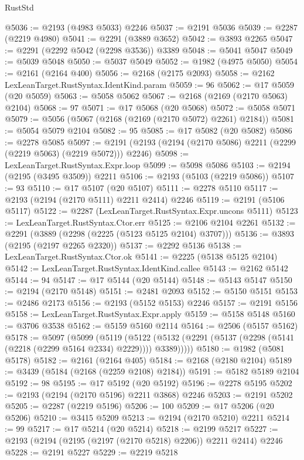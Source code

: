\begin{lexlean}{RustStd}
\begin{coremodule}
@5036 := @2193 (@4983 @5033) @2246
@5037 := @2191 @5036
@5039 := @2287 (@2219 @4980)
@5041 := @2291 (@3889 @3652)
@5042 := @3893 @2265
@5047 := @2291 (@2292 @5042 (@2298 @3536)) @3389
@5048 := @5041 @5047
@5049 := @5039 @5048
@5050 := @5037 @5049
@5052 := @1982 (@4975 @5050)
@5054 := @2161 (@2164 @400)
@5056 := @2168 (@2175 @2093)
@5058 := @2162 LexLeanTarget.RustSyntax.IdentKind.param
@5059 := 96
@5062 := @17 @5059 (@20 @5059)
@5063 := @5058 @5062
@5067 := @2168 (@2169 (@2170 @5063) @2104)
@5068 := 97
@5071 := @17 @5068 (@20 @5068)
@5072 := @5058 @5071
@5079 := @5056 (@5067 (@2168 (@2169 (@2170 @5072) @2261) @2184))
@5081 := @5054 @5079 @2104
@5082 := 95
@5085 := @17 @5082 (@20 @5082)
@5086 := @2278 @5085
@5097 := @2191 (@2193 (@2194 (@2170 @5086) @2211 (@2299 (@2219 @5063) (@2219 @5072))) @2246)
@5098 := LexLeanTarget.RustSyntax.Expr.loop
@5099 := @5098 @5086
@5103 := @2194 (@2195 (@3495 @3509)) @2211
@5106 := @2193 (@5103 (@2219 @5086))
@5107 := 93
@5110 := @17 @5107 (@20 @5107)
@5111 := @2278 @5110
@5117 := @2193 (@2194 (@2170 @5111) @2211 @2414) @2246
@5119 := @2191 (@5106 @5117)
@5122 := @2287 (LexLeanTarget.RustSyntax.Expr.uncons @5111)
@5123 := LexLeanTarget.RustSyntax.Ctor.err
@5125 := @2106 @2104 @2261
@5132 := @2291 (@3889 (@2298 (@2225 (@5123 @5125 @2104) @3707)))
@5136 := @3893 (@2195 (@2197 @2265 @2320))
@5137 := @2292 @5136
@5138 := LexLeanTarget.RustSyntax.Ctor.ok
@5141 := @2225 (@5138 @5125 @2104)
@5142 := LexLeanTarget.RustSyntax.IdentKind.callee
@5143 := @2162 @5142
@5144 := 94
@5147 := @17 @5144 (@20 @5144)
@5148 := @5143 @5147
@5150 := @2194 (@2170 @5148)
@5151 := @2481 @2093
@5152 := @5150 @5151
@5153 := @2486 @2173
@5156 := @2193 (@5152 @5153) @2246
@5157 := @2191 @5156
@5158 := LexLeanTarget.RustSyntax.Expr.apply
@5159 := @5158 @5148
@5160 := @3706 @3538
@5162 := @5159 @5160 @2114
@5164 := @2506 (@5157 @5162)
@5178 := @5097
    (@5099
      (@5119
        (@5122 (@5132 (@2291 (@5137 (@2298 (@5141 (@2218 (@2299 @5164 @2334) @2229)))) @3389)))))
@5180 := @1982 (@5081 @5178)
@5182 := @2161 (@2164 @405)
@5184 := @2168 (@2180 @2104)
@5189 := @3439 (@5184 (@2168 (@2259 @2108) @2184))
@5191 := @5182 @5189 @2104
@5192 := 98
@5195 := @17 @5192 (@20 @5192)
@5196 := @2278 @5195
@5202 := @2193 (@2194 (@2170 @5196) @2211 @3868) @2246
@5203 := @2191 @5202
@5205 := @2287 (@2219 @5196)
@5206 := 100
@5209 := @17 @5206 (@20 @5206)
@5210 := @3415 @5209
@5213 := @2194 (@2170 @5210) @2211
@5214 := 99
@5217 := @17 @5214 (@20 @5214)
@5218 := @2199 @5217
@5227 := @2193 (@2194 (@2195 (@2197 (@2170 @5218) @2206)) @2211 @2414) @2246
@5228 := @2191 @5227
@5229 := @2219 @5218

\end{coremodule}
\end{lexlean}
